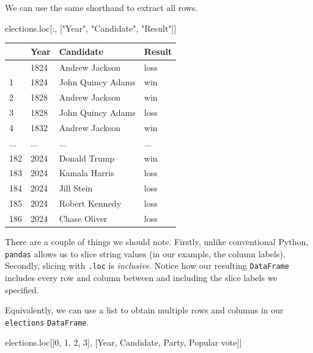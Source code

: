 \documentclass[
  letterpaper,
  DIV=11,
  numbers=noendperiod]{scrreprt}
\newenvironment{Shaded}{\begin{snugshade}}{\end{snugshade}}
\newcommand{\DecValTok}[1]{\textcolor[rgb]{0.68,0.00,0.00}{#1}}
\newcommand{\NormalTok}[1]{\textcolor[rgb]{0.00,0.23,0.31}{#1}}
\newcommand{\StringTok}[1]{\textcolor[rgb]{0.13,0.47,0.30}{#1}}
\begin{document}
We can use the same shorthand to extract all rows.

\begin{Shaded}
\begin{Highlighting}[]
\NormalTok{elections.loc[:, [}\StringTok{"Year"}\NormalTok{, }\StringTok{"Candidate"}\NormalTok{, }\StringTok{"Result"}\NormalTok{]]}
\end{Highlighting}
\end{Shaded}

\begin{longtable}[]{@{}llll@{}}
\toprule\noalign{}
& Year & Candidate & Result \\
\midrule\noalign{}
\endhead
\bottomrule\noalign{}
\endlastfoot
0 & 1824 & Andrew Jackson & loss \\
1 & 1824 & John Quincy Adams & win \\
2 & 1828 & Andrew Jackson & win \\
3 & 1828 & John Quincy Adams & loss \\
4 & 1832 & Andrew Jackson & win \\
... & ... & ... & ... \\
182 & 2024 & Donald Trump & win \\
183 & 2024 & Kamala Harris & loss \\
184 & 2024 & Jill Stein & loss \\
185 & 2024 & Robert Kennedy & loss \\
186 & 2024 & Chase Oliver & loss \\
\end{longtable}

There are a couple of things we should note. Firstly, unlike
conventional Python, \texttt{pandas} allows us to slice string values
(in our example, the column labels). Secondly, slicing with
\texttt{.loc} is \emph{inclusive}. Notice how our resulting
\texttt{DataFrame} includes every row and column between and including
the slice labels we specified.

Equivalently, we can use a list to obtain multiple rows and columns in
our \texttt{elections} \texttt{DataFrame}.

\begin{Shaded}
\begin{Highlighting}[]
\NormalTok{elections.loc[[}\DecValTok{0}\NormalTok{, }\DecValTok{1}\NormalTok{, }\DecValTok{2}\NormalTok{, }\DecValTok{3}\NormalTok{], [}\StringTok{\textquotesingle{}Year\textquotesingle{}}\NormalTok{, }\StringTok{\textquotesingle{}Candidate\textquotesingle{}}\NormalTok{, }\StringTok{\textquotesingle{}Party\textquotesingle{}}\NormalTok{, }\StringTok{\textquotesingle{}Popular vote\textquotesingle{}}\NormalTok{]]}
\end{Highlighting}
\end{Shaded}
\end{document}
